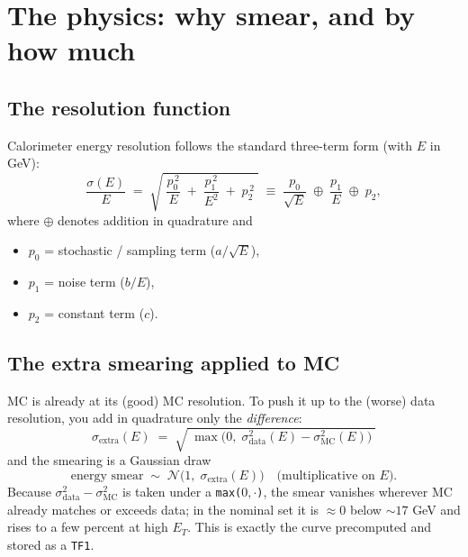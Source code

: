 \documentclass[11pt]{article}
\begin{document}
\section{The physics: why smear, and by how much}

\subsection{The resolution function}
Calorimeter energy resolution follows the standard three-term form (with $E$ in GeV):
\begin{equation}
\frac{\sigma(E)}{E} \;=\; \sqrt{\;\frac{p_0^{\,2}}{E} \;+\; \frac{p_1^{\,2}}{E^2} \;+\; p_2^{\,2}\;}
\;\equiv\; \frac{p_0}{\sqrt{E}} \;\oplus\; \frac{p_1}{E} \;\oplus\; p_2 ,
\label{eq:reso}
\end{equation}
where $\oplus$ denotes addition in quadrature and
\begin{itemize}[nosep]
  \item $p_0$ = stochastic / sampling term ($a/\sqrt{E}$),
  \item $p_1$ = noise term ($b/E$),
  \item $p_2$ = constant term ($c$).
\end{itemize}

\subsection{The extra smearing applied to MC}
MC is already at its (good) MC resolution. To push it up to the (worse) data
resolution, you add in quadrature only the \emph{difference}:
\begin{equation}
\boxed{\;\sigma_{\text{extra}}(E) \;=\; \sqrt{\;\max\!\big(0,\;\sigma_{\text{data}}^2(E)-\sigma_{\text{MC}}^2(E)\big)\;}\;}
\label{eq:quaddiff}
\end{equation}
and the smearing is a Gaussian draw
\begin{equation}
\text{energy smear} \;\sim\; \mathcal{N}\!\big(1,\;\sigma_{\text{extra}}(E)\big)\quad\text{(multiplicative on }E\text{).}
\label{eq:smear}
\end{equation}
Because $\sigma_{\text{data}}^2-\sigma_{\text{MC}}^2$ is taken under a
\texttt{max($0,\cdot$)}, the smear vanishes wherever MC already matches or
exceeds data; in the nominal set it is $\approx0$ below $\sim17$ GeV and rises to
a few percent at high $E_T$. This is exactly the curve precomputed and stored as a
\texttt{TF1}.
\end{document}
